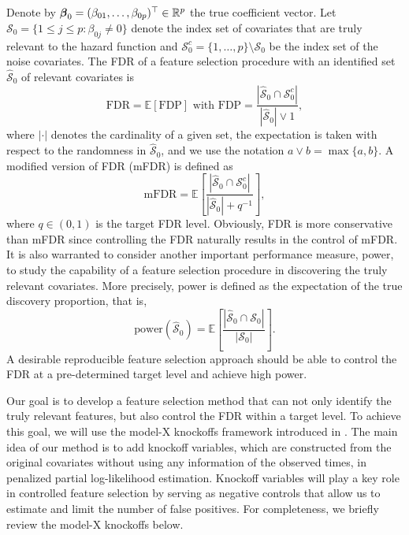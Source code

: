 \documentclass[11pt]{article}
\newcommand{\bbeta}{\mbox{\boldmath $\beta$}}
\begin{document}
Denote by $\bbeta_0=(\beta_{01}, \ldots, \beta_{0p})^{\top}\in\mathbb{R}^p$ the true coefficient vector.
Let $\mathcal{S}_0=\{1\leq j\leq p:\beta_{0j}\neq 0\}$ denote the index set of covariates that are truly relevant to the hazard function and $\mathcal{S}_0^c=\{1, \ldots, p\}\setminus\mathcal{S}_0$ be the index set of the noise covariates.  
The FDR of a feature selection procedure with an identified set $\widehat{\mathcal{S}}_0$ of relevant covariates is 
\begin{equation*}\label{FDRdf}
\mathrm{FDR} = \mathbb{E}[\mbox{FDP}]\,\,\mbox{with}\,\,
\mbox{FDP} = \frac{|\widehat{\mathcal{S}}_0 \cap \mathcal{S}_0^c|}{|\widehat{\mathcal{S}}_0|\vee 1},
\end{equation*}
where $|\cdot|$ denotes the cardinality of a given set, the expectation is taken with respect to the randomness in $\widehat{\mathcal{S}}_0$, and we use the notation $a \vee b=\max\{a, b\}$. A modified version of FDR (mFDR) is defined as
\begin{equation*}\label{mFDRdf}
\mathrm{mFDR} = \mathbb{E} \left[\frac{|\widehat{\mathcal{S}}_0 \cap \mathcal{S}_0^c|}{|\widehat{\mathcal{S}}_0|+q^{-1}}\right],
\end{equation*}
where $q\in(0, 1)$ is the target FDR level. %
Obviously, FDR is more conservative than mFDR since controlling the FDR naturally results in the control of mFDR. It is also warranted to consider another important performance measure, power, to study the capability of a feature selection procedure in discovering the truly relevant covariates. More precisely, power is defined as the expectation of the true discovery proportion, that is,
\begin{equation*}\label{power}
\mathrm{power}(\widehat{\mathcal{S}}_0 ) = \mathbb{E} \left[\frac{|\widehat{\mathcal{S}}_0 \cap \mathcal{S}_0|}{|\mathcal{S}_0|}\right].
\end{equation*}
A desirable reproducible feature selection approach should be able to control the FDR at a pre-determined target level and achieve high power.


Our goal is to develop a feature selection method that can not only identify the truly relevant features, but also control the FDR within a target level.  
To achieve this goal, we will use the model-X knockoffs framework introduced in \cite{candes2018panning}. The main idea of our method is to 
add knockoff variables, which are constructed from the original covariates without using any information of the observed times, in penalized partial log-likelihood estimation.
Knockoff variables will play a
key role in controlled feature selection by serving as negative controls that allow us to estimate and limit the number of false positives.  For completeness, we briefly review the model-X knockoffs below.
\end{document}
